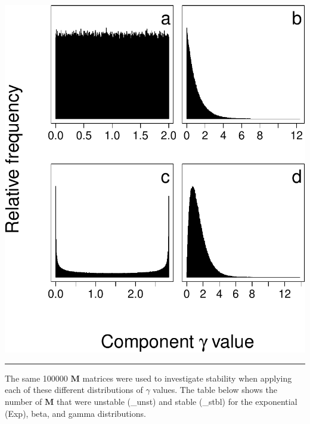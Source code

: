 \documentclass[]{article}
\begin{document}
\includegraphics{SI_files/figure-latex/unnamed-chunk-24-1.pdf}

\begin{center}\rule{0.5\linewidth}{\linethickness}\end{center}

The same 100000 \(\mathbf{M}\) matrices were used to investigate
stability when applying each of these different distributions of
\(\gamma\) values. The table below shows the number of \(\mathbf{M}\)
that were unstable (\_unst) and stable (\_stbl) for the exponential
(Exp), beta, and gamma distributions.
\end{document}
